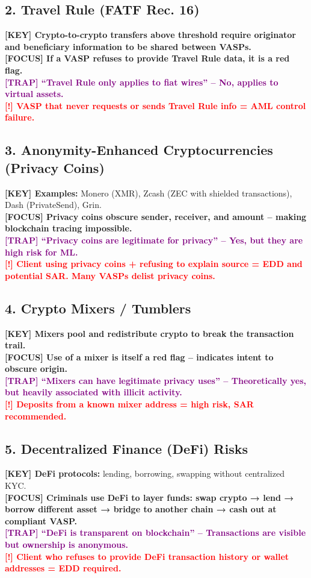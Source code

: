 \documentclass[10pt,a4paper]{article}
\newcommand{\redflag}[1]{\textcolor{red}{\textbf{[!] #1}}}
\newcommand{\examfocus}[1]{\textcolor{orange!80!black}{\textbf{[FOCUS] #1}}}
\newcommand{\trap}[1]{\textcolor{purple}{\textbf{[TRAP] #1}}}
\newcommand{\keyterm}[1]{\textcolor{red!80!black}{\textbf{[KEY] #1}}}
\begin{document}
\subsection*{2. Travel Rule (FATF Rec. 16)}
\keyterm{Crypto-to-crypto transfers above threshold require originator and beneficiary information to be shared between VASPs.} \\
\examfocus{If a VASP refuses to provide Travel Rule data, it is a red flag.} \\
\trap{“Travel Rule only applies to fiat wires” – No, applies to virtual assets.} \\
\redflag{VASP that never requests or sends Travel Rule info = AML control failure.}

\subsection*{3. Anonymity-Enhanced Cryptocurrencies (Privacy Coins)}
\keyterm{Examples:} Monero (XMR), Zcash (ZEC with shielded transactions), Dash (PrivateSend), Grin. \\
\examfocus{Privacy coins obscure sender, receiver, and amount – making blockchain tracing impossible.} \\
\trap{“Privacy coins are legitimate for privacy” – Yes, but they are high risk for ML.} \\
\redflag{Client using privacy coins + refusing to explain source = EDD and potential SAR. Many VASPs delist privacy coins.}

\subsection*{4. Crypto Mixers / Tumblers}
\keyterm{Mixers pool and redistribute crypto to break the transaction trail.} \\
\examfocus{Use of a mixer is itself a red flag – indicates intent to obscure origin.} \\
\trap{“Mixers can have legitimate privacy uses” – Theoretically yes, but heavily associated with illicit activity.} \\
\redflag{Deposits from a known mixer address = high risk, SAR recommended.}

\subsection*{5. Decentralized Finance (DeFi) Risks}
\keyterm{DeFi protocols:} lending, borrowing, swapping without centralized KYC. \\
\examfocus{Criminals use DeFi to layer funds: swap crypto → lend → borrow different asset → bridge to another chain → cash out at compliant VASP.} \\
\trap{“DeFi is transparent on blockchain” – Transactions are visible but ownership is anonymous.} \\
\redflag{Client who refuses to provide DeFi transaction history or wallet addresses = EDD required.}
\end{document}
